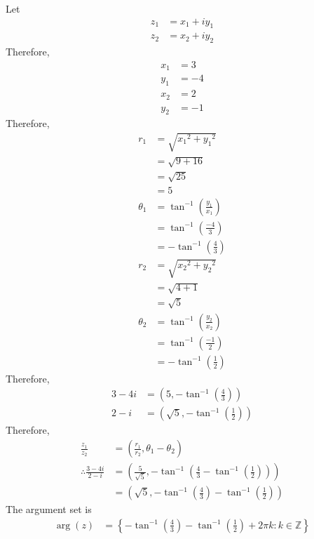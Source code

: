 \documentclass[fleqn, a4paper, 11pt, oneside]{amsart}
\theoremstyle{definition}
\theoremstyle{theorem}
\begin{document}
\begin{solution}
\begin{enumerate}[leftmargin=*]
			Let
			\begin{align*}
				z_1 &= x_1 + i y_1\\
				z_2 &= x_2 + i y_2
			\end{align*}
			Therefore,
			\begin{align*}
				x_1 &= 3\\
				y_1 &= -4\\
				x_2 &= 2\\
				y_2 &= -1
			\end{align*}
			Therefore,
			\begin{align*}
				r_1 &= \sqrt{{x_1}^2 + {y_1}^2}\\
				&= \sqrt{9 + 16}\\
				&= \sqrt{25}\\
				&= 5\\
				\theta_1 &= \tan^{-1}\left( \frac{y_1}{x_1} \right)\\
				&= \tan^{-1}\left( \frac{-4}{3} \right)\\
				&= -\tan^{-1}\left( \frac{4}{3} \right)\\
				r_2 &= \sqrt{{x_2}^2 + {y_2}^2}\\
				&= \sqrt{4 + 1}\\
				&= \sqrt{5}\\
				\theta_2 &= \tan^{-1}\left( \frac{y_2}{x_2} \right)\\
				&= \tan^{-1}\left( \frac{-1}{2} \right)\\
				&= -\tan^{-1}\left( \frac{1}{2} \right)
			\end{align*}
			Therefore,
			\begin{align*}
				3 - 4 i &= \left( 5 , -\tan^{-1}\left( \frac{4}{3} \right) \right)\\
				2 - i &= \left( \sqrt{5} , -\tan^{-1}\left( \frac{1}{2} \right) \right)
			\end{align*}
			Therefore,
			\begin{align*}
				\frac{z_1}{z_2} &= \left( \frac{r_1}{r_2} , \theta_1 - \theta_2 \right)\\
				\therefore \frac{3 - 4 i}{2 - i} &= \left( \frac{5}{\sqrt{5}} , -\tan^{-1}\left( \frac{4}{3} - \tan^{-1}\left( \frac{1}{2} \right) \right) \right)\\
				&= \left( \sqrt{5} , -\tan^{-1}\left( \frac{4}{3} \right) - \tan^{-1}\left( \frac{1}{2} \right) \right)
			\end{align*}
			The argument set is
			\begin{align*}
				\arg(z) &= \left\{ -\tan^{-1}\left( \frac{4}{3} \right) - \tan^{-1}\left( \frac{1}{2} \right) + 2 \pi k : k \in \mathbb{Z} \right\}
			\end{align*}
	\end{enumerate}
\end{solution}
\end{document}
